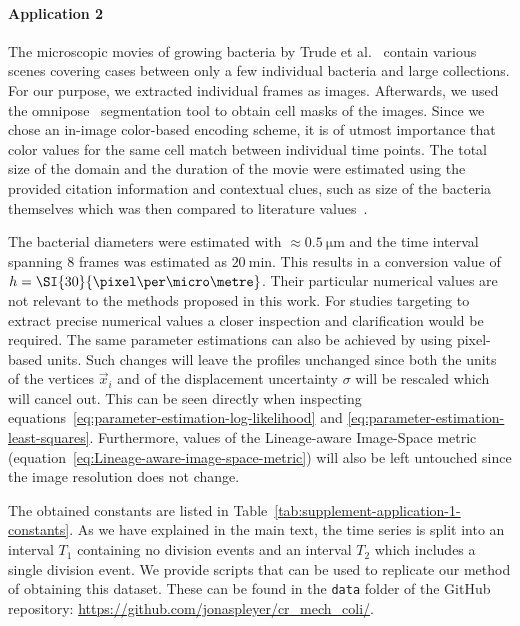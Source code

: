 \paragraph*{Application 2}
\label{sec:supplement-data-details}
The microscopic movies of growing bacteria by Trude et al.~\cite{Trude1982} contain various scenes
covering cases between only a few individual bacteria and large collections.
For our purpose, we extracted individual frames as images.
Afterwards, we used the omnipose~\cite{Cutler2022} segmentation tool to obtain cell masks of the
images. Since we chose an in-image color-based encoding scheme, it is of utmost importance that
color values for the same cell match between individual time points.
The total size of the domain and the duration of the movie were estimated using the provided citation
information and contextual clues, such as size of the bacteria themselves which was then compared to
literature values~\cite{Nelson2000}.

The bacterial diameters were estimated with $\approx\SI{0.5}{\micro\metre}$ and the time
interval spanning $8$ frames was estimated as $\SI{20}{\minute}$.
This results in a conversion value of $h=\SI{30}{\pixel\per\micro\metre}$.
Their particular numerical values are not relevant to the methods proposed in this work.
For studies targeting to extract precise numerical
values a closer inspection and clarification would be required.
The same parameter estimations can also be achieved by using pixel-based units.
Such changes will leave the profiles unchanged since both the units of the vertices $\vec{x}_i$ and
of the displacement uncertainty $\sigma$ will be rescaled which will cancel out.
This can be seen directly when inspecting equations~\ref{eq:parameter-estimation-log-likelihood} and
\ref{eq:parameter-estimation-least-squares}.
Furthermore, values of the Lineage-aware Image-Space metric
(equation~\ref{eq:Lineage-aware-image-space-metric}) will also be left untouched since the image
resolution does not change.

The obtained constants are listed in Table~\ref{tab:supplement-application-1-constants}.
As we have explained in the main text, the time series is split into an interval $T_1$ containing no
division events and an interval $T_2$ which includes a single division event.
We provide scripts that can be used to replicate our method of obtaining this dataset.
These can be found in the \texttt{data} folder of the GitHub repository:
\url{https://github.com/jonaspleyer/cr_mech_coli/}.


